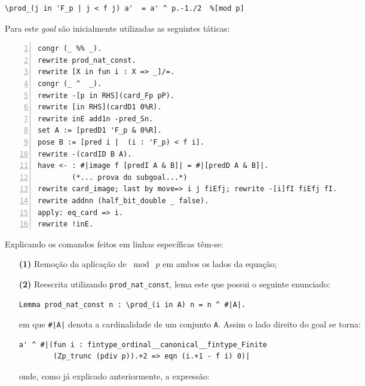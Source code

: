 \begin{enumerate}[label=\textbf{\roman*.}]
\begin{enumerate}[label=\textbf{(\alph*)}]
\begin{enumerate}[label=\textbf{(\alph{enumii}.\arabic*)}]
                                \begin{lstlisting}[language=coq,frame=single,tabsize=1]
\prod_(j in 'F_p | j < f j) a'  = a' ^ p.-1./2  %[mod p]
                                \end{lstlisting}
                        Para este \textit{goal} são inicialmente utilizadas as seguintes táticas:

                                \begin{lstlisting}[language=coq,frame=single, numbers=left,stepnumber=1,tabsize=1, escapechar=\$]
congr (_ %% _).
rewrite prod_nat_const.
rewrite [X in fun i : X => _]/=.
congr (_ ^  _).
rewrite -[p in RHS](card_Fp pP).
rewrite [in RHS](cardD1 0%R).
rewrite inE add1n -pred_Sn.
set A := [predD1 'F_p & 0%R].
pose B := [pred i |  (i : 'F_p) < f i].
rewrite -(cardID B A).
have <- : #|image f [predI A & B]| = #|[predD A & B]|.
        (*... prova do subgoal...*)
rewrite card_image; last by move=> i j fiEfj; rewrite -[i]fI fiEfj fI.
rewrite addnn (half_bit_double _ false).
apply: eq_card => i.
rewrite !inE.
                                \end{lstlisting}
                        Explicando os comandos feitos em linhas específicas têm-se:

                        \begin{enumerate}[listparindent=\parindent]

                                \item[\textbf{(1)}] Remoção da aplicação de $\bmod \; p$ em ambos os lados da equação; 

                                \item[\textbf{(2)}] Reescrita utilizando \lstinline[language=coq]|prod_nat_const|, lema este que possui o seguinte enunciado:
                                
                                        \begin{lstlisting}[language=coq,frame=single,tabsize=1]
Lemma prod_nat_const n : \prod_(i in A) n = n ^ #|A|.
                                        \end{lstlisting}
                                em que \lstinline[language=coq]!#|A|! denota a cardinalidade de um conjunto \lstinline[language=coq]!A!. Assim o lado direito do goal se torna:

                                        \begin{lstlisting}[language=coq,frame=single,tabsize=1]
a' ^ #|(fun i : fintype_ordinal__canonical__fintype_Finite 
        (Zp_trunc (pdiv p)).+2 => eqn (i.+1 - f i) 0)|
                                        \end{lstlisting}
                                onde, como já explicado anteriormente, a expressão:


\end{enumerate}
\end{enumerate}
\end{enumerate}
\end{enumerate}
